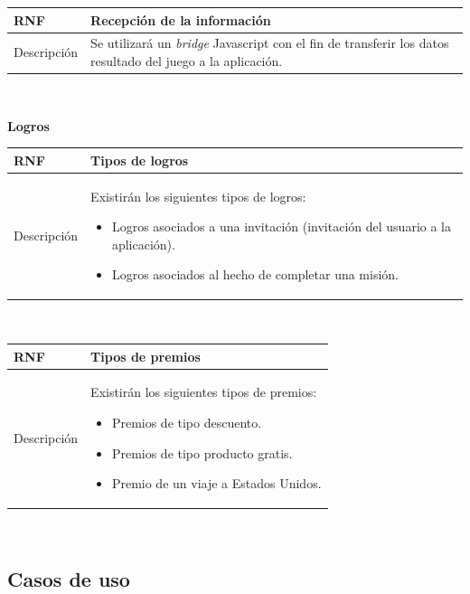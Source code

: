 \documentclass[twoside]{report}
\newcommand\addrow[2]{#1 &#2\\ }
\newcommand\addheading[2]{#1 &#2\\ \hline}
\newcommand\tabularhead{\begin{tabular}{lp{0.7\textwidth}}
\hline
}
\newenvironment{req}{\tabularhead}
{\hline\end{tabular}}
\begin{document}
\vspace{0.25cm}

\begin{req}
	\addheading{\textbf{RNF\arabic{nonFunctionalRequirements}}}{Recepción de la información}
	\addrow{Descripción}{Se utilizará un \textit{bridge} Javascript con el fin de transferir los datos resultado del juego a la aplicación.}
\end{req}\\

\vspace{1cm}

\textbf{Logros}\\

\begin{req}
	\addheading{\textbf{RNF\arabic{nonFunctionalRequirements}}}{Tipos de logros}
	\addrow{Descripción}{Existirán los siguientes tipos de logros:
	\begin{itemize}
	\item Logros asociados a una invitación (invitación del usuario a la aplicación).
	\item Logros asociados al hecho de completar una misión.
	\end{itemize}}
\end{req}\\

\vspace{0.25cm}

\begin{req}
	\addheading{\textbf{RNF\arabic{nonFunctionalRequirements}}}{Tipos de premios}
	\addrow{Descripción}{Existirán los siguientes tipos de premios:
	\begin{itemize}
	\item Premios de tipo descuento.
	\item Premios de tipo producto gratis.
	\item Premio de un viaje a Estados Unidos.
	\end{itemize}}
\end{req}\\

\vspace{1cm}

\subsection{Casos de uso}
\end{document}
